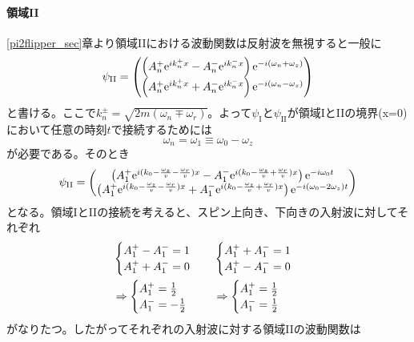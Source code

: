 \paragraph{領域II}
\ref{pi2flipper_sec}章より領域IIにおける波動関数は反射波を無視すると一般に
\begin{equation}
\psi_\mathrm{II}=\begin{pmatrix} \left(A_n^+ \mathrm{e}^{ik_n^+x} -A_n^-\mathrm{e}^{ik_n^-x}\right)\mathrm{e}^{-i(\omega_n+\omega_z)} \\ \left(A_n^+ \mathrm{e}^{ik_n^+x} +A_n^-\mathrm{e}^{ik_n^-x} \right)\mathrm{e}^{-i(\omega_n-\omega_z)}\end{pmatrix}
\end{equation}
と書ける。ここで$k_n^\pm=\sqrt{2m(\omega_n\mp\omega_r)}$。よって$\psi_\mathrm{I}$と$\psi_\mathrm{II}$が領域IとIIの境界(x=0)において任意の時刻$t$で接続するためには
\begin{equation}
\omega_n=\omega_1\equiv \omega_0-\omega_z
\end{equation}
が必要である。そのとき
\begin{equation}
\psi_\mathrm{II}=\begin{pmatrix} \left(A_1^+ \mathrm{e}^{i(k_0-\frac{\omega_z}{v}-\frac{\omega_r}{v})x} -A_1^-\mathrm{e}^{i(k_0-\frac{\omega_z}{v}+\frac{\omega_r}{v})x}\right)\mathrm{e}^{-i\omega_0t} \\ \left(A_1^+ \mathrm{e}^{i(k_0-\frac{\omega_z}{v}-\frac{\omega_r}{v})x} +A_1^-\mathrm{e}^{i(k_0-\frac{\omega_z}{v}+\frac{\omega_r}{v})x}\right)\mathrm{e}^{-i(\omega_0-2\omega_z)t}\end{pmatrix}
\end{equation}
となる。領域IとIIの接続を考えると、スピン上向き、下向きの入射波に対してそれぞれ
\begin{align}
&\begin{cases}A_1^+-A_1^-=1\\A_1^++A_1^-=0\end{cases} &&\begin{cases}A_1^++A_1^-=1\\A_1^+-A_1^-=0\end{cases} \notag \\
&\Rightarrow \begin{cases} A_1^+=\frac{1}{2} \\ A_1^-=-\frac{1}{2}\end{cases} &&\Rightarrow \begin{cases} A_1^+=\frac{1}{2} \\ A_1^-=\frac{1}{2}\end{cases}
\end{align}
がなりたつ。したがってそれぞれの入射波に対する領域IIの波動関数は
